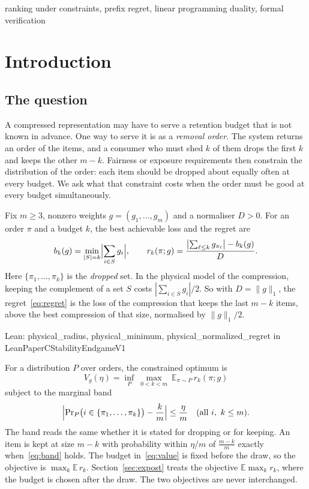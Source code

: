 \documentclass[conference]{IEEEtran}
\theoremstyle{definition}
\newcommand{\lean}[1]{\textsf{\footnotesize #1}}
\newcommand{\leanbox}[1]{%
  \par\vspace{2pt}\noindent
  {\raggedright\footnotesize\textsf{Lean: #1}\par}\vspace{2pt}}
\begin{document}
\begin{IEEEkeywords}
ranking under constraints, prefix regret, linear programming duality, formal verification
\end{IEEEkeywords}

\section{Introduction}
\label{sec:intro}

\subsection{The question}

A compressed representation may have to serve a retention budget that is not known in advance. One way to
serve it is as a \emph{removal order}. The system returns an order of the items, and a
consumer who must shed $k$ of them drops the first $k$ and keeps the other $m-k$. Fairness or
exposure requirements then constrain the distribution of the order: each item should be
dropped about equally often at every budget. We ask what that constraint costs when the order
must be good at every budget simultaneously.

Fix $m\ge3$, nonzero weights $g=(g_{1},\dots,g_{m})$ and a normaliser $D>0$. For an order $\pi$ and a budget
$k$, the best achievable loss and the regret are
\begin{equation}
b_{k}(g)=\min_{|S|=k}\Bigl|\sum_{i\in S}g_{i}\Bigr|,\qquad
r_{k}(\pi;g)=\frac{\bigl|\sum_{\ell\le k}g_{\pi_{\ell}}\bigr|-b_{k}(g)}{D}.
\label{eq:regret}
\end{equation}
Here $\{\pi_{1},\dots,\pi_{k}\}$ is the \emph{dropped} set. In the physical model of the
compression, keeping the complement of a set $S$ costs $|\sum_{i\in S}g_{i}|/2$. So with
$D=\|g\|_{1}$, the regret~\eqref{eq:regret} is the loss of the compression that keeps the
last $m-k$ items, above the best compression of that size, normalised by $\|g\|_{1}/2$.

\leanbox{\lean{physical\_radius}, \lean{physical\_minimum}, \lean{physical\_normalized\_regret}
in \lean{LeanPaperCStabilityEndgameV1}}

For a distribution $P$ over orders, the constrained optimum is
\begin{equation}
V_{g}(\eta)=\inf_{P}\ \max_{0<k<m}\ \mathbb{E}_{\pi\sim P}\,r_{k}(\pi;g)
\label{eq:value}
\end{equation}
subject to the marginal band
\begin{equation}
\Bigl|\Pr\nolimits_{P}\bigl(i\in\{\pi_{1},\dots,\pi_{k}\}\bigr)-\frac{k}{m}\Bigr|\le\frac{\eta}{m}
\quad(\text{all }i,\ k\le m).
\label{eq:band}
\end{equation}
The band reads the same whether it is stated for dropping or for keeping. An item is kept at
size $m-k$ with probability within $\eta/m$ of $\frac{m-k}{m}$ exactly
when~\eqref{eq:band} holds. The budget in~\eqref{eq:value} is fixed before the draw, so the
objective is $\max_{k}\mathbb{E}\,r_{k}$. Section~\ref{sec:expost} treats the objective
$\mathbb{E}\max_{k}r_{k}$, where the budget is chosen after the draw. The two objectives are
never interchanged.
\end{document}

